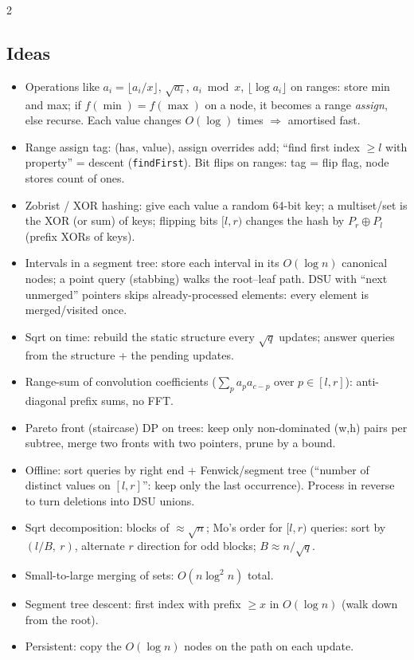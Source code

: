 \documentclass[8pt,a4paper]{extarticle}
\begin{document}
\begin{multicols*}{2}
\subsection{Ideas}
\begin{itemize}
\item Operations like $a_i=\lfloor a_i/x\rfloor$, $\sqrt{a_i}$, $a_i \bmod x$,
  $\lfloor\log a_i\rfloor$ on ranges: store min and max; if $f(\min)=f(\max)$
  on a node, it becomes a range \emph{assign}, else recurse. Each value
  changes $O(\log)$ times $\Rightarrow$ amortised fast.
\item Range assign tag: (has, value), assign overrides add; ``find first
  index $\ge l$ with property'' = descent (\texttt{findFirst}). Bit flips on
  ranges: tag = flip flag, node stores count of ones.
\item Zobrist / XOR hashing: give each value a random 64-bit key; a
  multiset/set is the XOR (or sum) of keys; flipping bits $[l,r)$ changes the
  hash by $P_r \oplus P_l$ (prefix XORs of keys).
\item Intervals in a segment tree: store each interval in its $O(\log n)$
  canonical nodes; a point query (stabbing) walks the root--leaf path.
  DSU with ``next unmerged'' pointers skips already-processed elements:
  every element is merged/visited once.
\item Sqrt on time: rebuild the static structure every $\sqrt q$ updates;
  answer queries from the structure + the pending updates.
\item Range-sum of convolution coefficients ($\sum_{p} a_p a_{c-p}$ over
  $p\in[l,r]$): anti-diagonal prefix sums, no FFT.
\item Pareto front (staircase) DP on trees: keep only non-dominated
  (w,h) pairs per subtree, merge two fronts with two pointers, prune
  by a bound.
\item Offline: sort queries by right end + Fenwick/segment tree
  (``number of distinct values on $[l,r]$'': keep only the last
  occurrence). Process in reverse to turn deletions into DSU unions.
\item Sqrt decomposition: blocks of $\approx\sqrt n$; Mo's order for
  $[l,r)$ queries: sort by $(l/B,\ r)$, alternate $r$ direction for odd
  blocks; $B\approx n/\sqrt q$.
\item Small-to-large merging of sets: $O(n\log^2 n)$ total.
\item Segment tree descent: first index with prefix $\ge x$ in $O(\log n)$
  (walk down from the root).
\item Persistent: copy the $O(\log n)$ nodes on the path on each update.
\end{itemize}


\end{multicols*}
\end{document}
